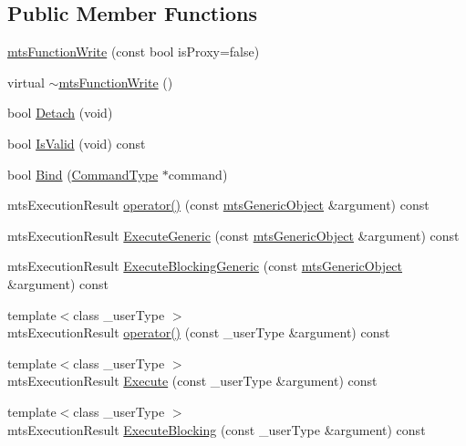 \subsection*{Public Member Functions}
\begin{DoxyCompactItemize}
\item 
\hyperlink{classmts_function_write_a2c89c104fe66415fee44e7e0432c1169}{mts\+Function\+Write} (const bool is\+Proxy=false)
\item 
virtual \hyperlink{classmts_function_write_a3fa79d1d185c75ed9de6183867baf4d8}{$\sim$mts\+Function\+Write} ()
\item 
bool \hyperlink{classmts_function_write_a5d12c15fbc7bba0fb783330c5d6c69fe}{Detach} (void)
\item 
bool \hyperlink{classmts_function_write_a30285c8f7b9f5a8763b7dfa5f71e4d87}{Is\+Valid} (void) const 
\item 
bool \hyperlink{classmts_function_write_ac7a1185a062f2d9688dd7c88b1b85f35}{Bind} (\hyperlink{classmts_function_write_a4b81286be87adec18b358ebaa9ebb2be}{Command\+Type} $\ast$command)
\item 
mts\+Execution\+Result \hyperlink{classmts_function_write_ab60d432bb548395daa6d5d507a862ea1}{operator()} (const \hyperlink{classmts_generic_object}{mts\+Generic\+Object} \&argument) const 
\item 
mts\+Execution\+Result \hyperlink{classmts_function_write_a982352c95740e327e802c06dc3c9e4cf}{Execute\+Generic} (const \hyperlink{classmts_generic_object}{mts\+Generic\+Object} \&argument) const 
\item 
mts\+Execution\+Result \hyperlink{classmts_function_write_ab6c1d3a03e3fe06527da35598f660524}{Execute\+Blocking\+Generic} (const \hyperlink{classmts_generic_object}{mts\+Generic\+Object} \&argument) const 
\item 
{\footnotesize template$<$class \+\_\+user\+Type $>$ }\\mts\+Execution\+Result \hyperlink{classmts_function_write_af52b6e7e9c1b0a2f04574da77b478d2f}{operator()} (const \+\_\+user\+Type \&argument) const 
\item 
{\footnotesize template$<$class \+\_\+user\+Type $>$ }\\mts\+Execution\+Result \hyperlink{classmts_function_write_a79f0bfa0e2cf1d96aa93bf4876406437}{Execute} (const \+\_\+user\+Type \&argument) const 
\item 
{\footnotesize template$<$class \+\_\+user\+Type $>$ }\\mts\+Execution\+Result \hyperlink{classmts_function_write_a6485d6f43ce827afed11a155c43dbeef}{Execute\+Blocking} (const \+\_\+user\+Type \&argument) const 

\end{DoxyCompactItemize}

